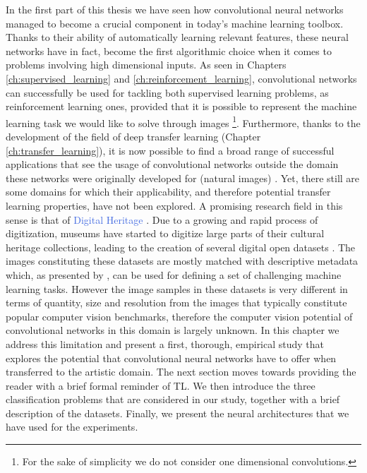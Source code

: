 In the first part of this thesis we have seen how convolutional neural networks managed to become a crucial component in today's machine learning toolbox. Thanks to their ability of automatically learning relevant features, these neural networks have in fact, become the first algorithmic choice when it comes to problems involving high dimensional inputs. As seen in Chapters \ref{ch:supervised_learning} and \ref{ch:reinforcement_learning}, convolutional networks can successfully be used for tackling both supervised learning problems, as reinforcement learning ones, provided that it is possible to represent the machine learning task we would like to solve through images \footnote{For the sake of simplicity we do not consider one dimensional convolutions.}. Furthermore, thanks to the development of the field of deep transfer learning (Chapter \ref{ch:transfer_learning}), it is now possible to find a broad range of successful applications that see the usage of convolutional networks outside the domain these networks were originally developed for (natural images) \cite{kornblith2018better}. Yet, there still are some domains for which their applicability, and therefore potential transfer learning properties, have not been explored. A promising research field in this sense is that of \textcolor{RoyalBlue}{Digital Heritage} \cite{parry2005digital}. Due to a growing and rapid process of digitization, museums have started to digitize large parts of their cultural heritage collections, leading to the creation of several digital open datasets \cite{allen2000collaboration, mensink2014rijksmuseum}. The images constituting these datasets are mostly matched with descriptive metadata  which, as presented by \citet{mensink2014rijksmuseum}, can be used for defining a set of challenging machine learning tasks. However the image samples in these datasets is very different in terms of quantity, size and resolution from the images that typically constitute popular computer vision benchmarks, therefore the computer vision potential of convolutional networks in this domain is largely unknown. In this chapter we address this limitation and present a first, thorough, empirical study that explores the potential that convolutional neural networks have to offer when transferred to the artistic domain. The next section moves towards providing the reader with a brief formal reminder of TL. We then introduce the three classification problems that are considered in our study, together with a brief description of the datasets. Finally, we present the neural architectures that we have used for the experiments. 

